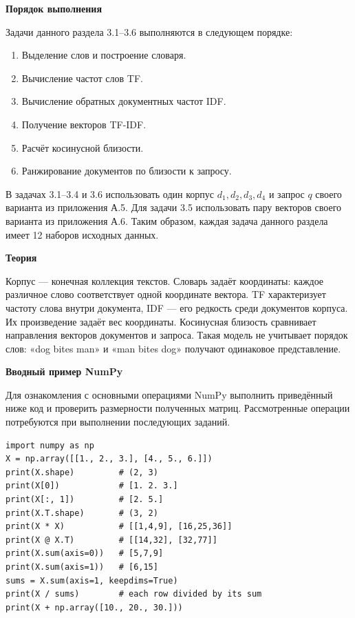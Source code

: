 \documentclass[12pt,a4paper]{article}
\newcommand{\taskhead}[1]{\par\textbf{#1}\par}
\begin{document}
\taskhead{Порядок выполнения}
Задачи данного раздела 3.1--3.6 выполняются в следующем порядке:
\begin{enumerate}
\item Выделение слов и построение словаря.
\item Вычисление частот слов TF.
\item Вычисление обратных документных частот IDF.
\item Получение векторов TF-IDF.
\item Расчёт косинусной близости.
\item Ранжирование документов по близости к запросу.
\end{enumerate}
В задачах 3.1--3.4 и 3.6 использовать один корпус $d_1,d_2,d_3,d_4$
и запрос $q$ своего варианта из приложения А.5. Для задачи 3.5 использовать
пару векторов своего варианта из приложения А.6. Таким образом, каждая
задача данного раздела имеет 12 наборов исходных данных.

\taskhead{Теория}
Корпус --- конечная коллекция текстов. Словарь задаёт координаты:
каждое различное слово соответствует одной координате вектора.
TF характеризует частоту слова внутри документа, IDF --- его редкость
среди документов корпуса. Их произведение задаёт вес координаты.
Косинусная близость сравнивает направления векторов документов и запроса.
Такая модель не учитывает порядок слов: «dog bites man» и
«man bites dog» получают одинаковое представление.

\taskhead{Вводный пример NumPy}

Для ознакомления с основными операциями NumPy выполнить приведённый ниже код и проверить размерности полученных матриц. Рассмотренные операции потребуются при выполнении последующих заданий.

\begin{lstlisting}[style=commands]
import numpy as np
X = np.array([[1., 2., 3.], [4., 5., 6.]])
print(X.shape)         # (2, 3)
print(X[0])            # [1. 2. 3.]
print(X[:, 1])         # [2. 5.]
print(X.T.shape)       # (3, 2)
print(X * X)           # [[1,4,9], [16,25,36]]
print(X @ X.T)         # [[14,32], [32,77]]
print(X.sum(axis=0))   # [5,7,9]
print(X.sum(axis=1))   # [6,15]
sums = X.sum(axis=1, keepdims=True)
print(X / sums)        # each row divided by its sum
print(X + np.array([10., 20., 30.]))
\end{lstlisting}
\end{document}
